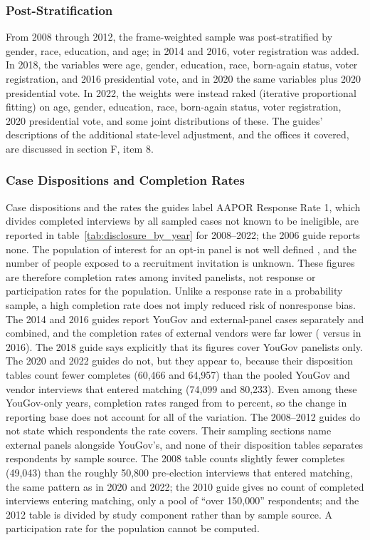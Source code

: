 \documentclass[12pt]{article}
\begin{document}
\subsubsection*{Post-Stratification}
From 2008 through 2012, the frame-weighted sample was post-stratified by gender, race, education, and age; in 2014 and 2016, voter registration was added. In 2018, the variables were age, gender, education, race, born-again status, voter registration, and 2016 presidential vote, and in 2020 the same variables plus 2020 presidential vote. In 2022, the weights were instead raked (iterative proportional fitting) on age, gender, education, race, born-again status, voter registration, 2020 presidential vote, and some joint distributions of these. The guides' descriptions of the additional state-level adjustment, and the offices it covered, are discussed in section F, item 8.

\subsubsection*{Case Dispositions and Completion Rates}
Case dispositions and the rates the guides label AAPOR Response Rate 1, which divides completed interviews by all sampled cases not known to be ineligible, are reported in table~\ref{tab:disclosure_by_year} for 2008--2022; the 2006 guide reports none. The population of interest for an opt-in panel is not well defined \parencite[78]{aapor2023}, and the number of people exposed to a recruitment invitation is unknown. These figures are therefore completion rates among invited panelists, not response or participation rates for the population. Unlike a response rate in a probability sample, a high completion rate does not imply reduced risk of nonresponse bias. The 2014 and 2016 guides report YouGov and external-panel cases separately and combined, and the completion rates of external vendors were far lower (\GuideCompletionYouGov{} versus \GuideCompletionExternal{} in 2016). The 2018 guide says explicitly that its figures cover YouGov panelists only. The 2020 and 2022 guides do not, but they appear to, because their disposition tables count fewer completes (60,466 and 64,957) than the pooled YouGov and vendor interviews that entered matching (74,099 and 80,233). Even among these YouGov-only years, completion rates ranged from \CompletionRateRecentMin{} to \CompletionRateRecentMax{} percent, so the change in reporting base does not account for all of the variation. The 2008--2012 guides do not state which respondents the rate covers. Their sampling sections name external panels alongside YouGov's, and none of their disposition tables separates respondents by sample source. The 2008 table counts slightly fewer completes (49,043) than the roughly 50,800 pre-election interviews that entered matching, the same pattern as in 2020 and 2022; the 2010 guide gives no count of completed interviews entering matching, only a pool of ``over 150,000'' respondents; and the 2012 table is divided by study component rather than by sample source. A participation rate for the population cannot be computed.
\end{document}

